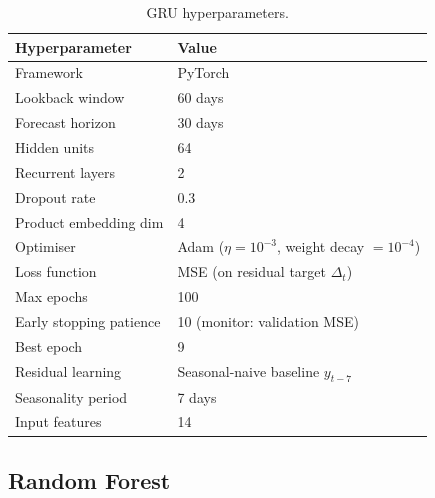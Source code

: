 \documentclass[12pt, a4paper]{article}
\begin{document}
\begin{table}[H]
    \centering
    \caption{GRU hyperparameters.}
    \label{tab:gru_hp}
    \renewcommand{\arraystretch}{1.2}
    \begin{tabular}{@{}ll@{}}
        \toprule
        \textbf{Hyperparameter} & \textbf{Value} \\
        \midrule
        Framework                & PyTorch \\
        Lookback window          & 60 days \\
        Forecast horizon         & 30 days \\
        Hidden units             & 64 \\
        Recurrent layers         & 2 \\
        Dropout rate             & 0.3 \\
        Product embedding dim    & 4 \\
        Optimiser                & Adam ($\eta = 10^{-3}$, weight decay $= 10^{-4}$) \\
        Loss function            & MSE (on residual target $\Delta_t$) \\
        Max epochs               & 100 \\
        Early stopping patience  & 10 (monitor: validation MSE) \\
        Best epoch               & 9 \\
        Residual learning        & Seasonal-naive baseline $y_{t-7}$ \\
        Seasonality period       & 7 days \\
        Input features           & 14 \\
        \bottomrule
    \end{tabular}
\end{table}

\subsection{Random Forest}
\end{document}
